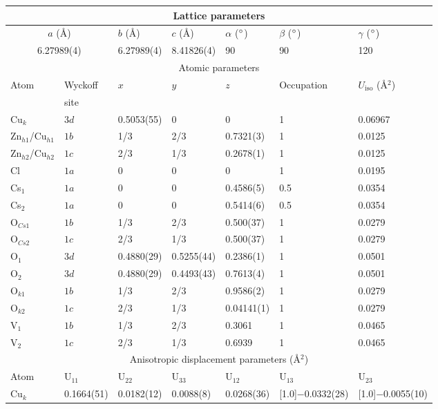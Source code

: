 \documentclass[
sn-mathphys,
Numbered,
onecolumn]
{sn-jnl}%
\newcommand{\minus}{\scalebox{0.75}[1.0]{$-$}}
\begin{document}
\begin{table}
    \centering
    \begin{tabular}{ p{2cm} p{1.8cm} p{2cm} p{} p{} p{} p{}} \hline \hline
    \multicolumn{7}{c}{Lattice parameters} \\ \hline
     \multicolumn{2}{c}{$a$ (\AA)}  & $b$ (\AA) & $c$ (\AA) & $\alpha$ ($\degree$) & $\beta$ ($\degree$) & $\gamma$ ($\degree$)  \\ \hline
     \multicolumn{2}{c}{6.27989(4)} & 6.27989(4) & 8.41826(4) & 90 & 90 & 120  \\ \hline
    \multicolumn{7}{c}{Atomic parameters} \\ \hline
     Atom  & Wyckoff & $x$ & $y$ & $z$ & Occupation & $U_\mathrm{iso}$ (\AA$^2$) \\
     & site & & & & & \\ \hline
 Cu$_{k}$ & $3d$ &  0.5053(55) & 0 & 0  & 1 & 0.06967 \\
 Zn$_{h1}$/Cu$_{h1}$ & $1b$ & 1/3 & 2/3  & 0.7321(3)  & 1 & 0.0125  \\
 Zn$_{h2}$/Cu$_{h2}$ & $1c$ & 2/3 & 1/3  & 0.2678(1)  & 1 & 0.0125  \\
 Cl & $1a$ & 0  & 0 & 0 & 1 & 0.0195 \\
 Cs$_1$ &  $1a$ &  0 &  0 &  0.4586(5) & 0.5 & 0.0354 \\
 Cs$_2$ &  $1a$ &  0 &  0 &  0.5414(6) & 0.5 & 0.0354 \\
 O$_{Cs1}$ & $1b$ & 1/3 & 2/3 & 0.500(37) & 1 & 0.0279  \\
 O$_{Cs2}$ & $1c$ & 2/3 & 1/3 & 0.500(37) & 1 & 0.0279  \\
 O$_1$  & $3d$ & 0.4880(29)  & 0.5255(44)  & 0.2386(1) & 1 & 0.0501 \\
 O$_2$  & $3d$ & 0.4880(29)  & 0.4493(43)  & 0.7613(4) & 1 & 0.0501 \\
 O$_{k1}$  & $1b$ & 1/3  & 2/3  & 0.9586(2) & 1 & 0.0279 \\
  O$_{k2}$  & $1c$ & 2/3  & 1/3  & 0.04141(1) & 1 & 0.0279 \\
 V$_1$  & $1b$ & 1/3  & 2/3  & 0.3061 & 1 & 0.0465 \\
 V$_2$  & $1c$ & 2/3  & 1/3  & 0.6939 & 1 & 0.0465 \\
    \hline 
    \multicolumn{7}{c}{Anisotropic displacement parameters (\AA$^2$)} \\ \hline 
  Atom &  U$_{11}$ & U$_{22}$ & U$_{33}$ & U$_{12}$ & U$_{13}$ & U$_{23}$ \\ \hline 
Cu$_{k}$ & 0.1664(51) & 0.0182(12) & 0.0088(8) & 0.0268(36) &  \minus 0.0332(28) & \minus 0.0055(10) \\

\end{tabular}
\end{table}
\end{document}
